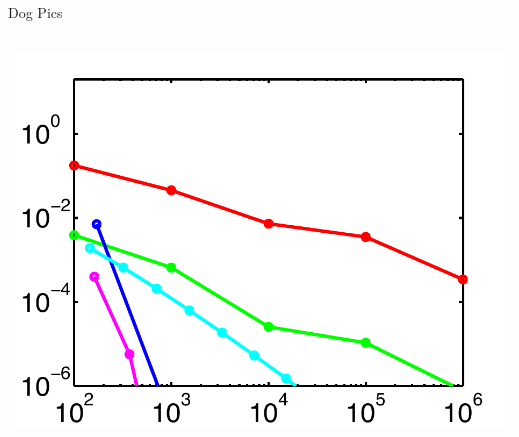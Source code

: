 \documentclass[final]{beamer}
\begin{document}
\begin{frame}{}
{\begin{columns}[t]
\begin{column}{.30\linewidth}
\begin{block}{\centering Dog Pics}
\vspace{0.5em}
\begin{columns}[T]

\begin{column}{12cm}{}
\centering\includegraphics[height=10cm, width = 14cm]{figures/gaussian2errors}\\


\end{column}
\end{columns}
\end{block}
\end{column}
\end{columns}}
\end{frame}
\end{document}

